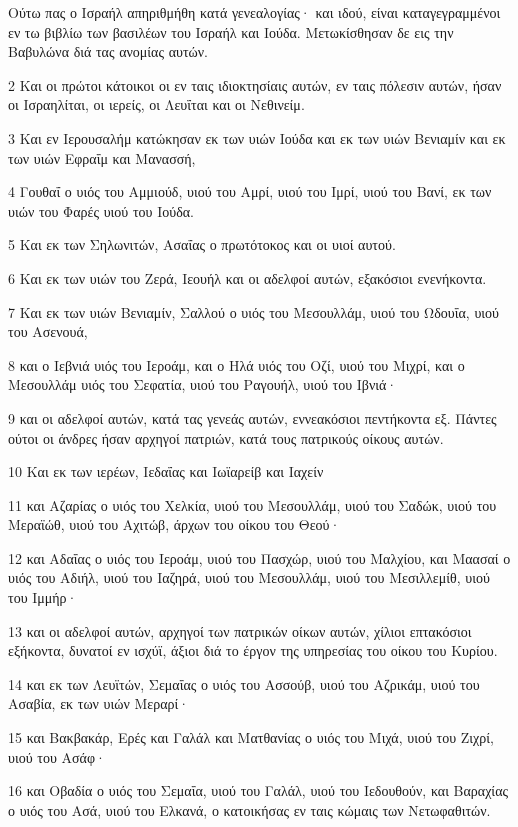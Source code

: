 \par Ούτω πας ο Ισραήλ απηριθμήθη κατά γενεαλογίας· και ιδού, είναι καταγεγραμμένοι εν τω βιβλίω των βασιλέων του Ισραήλ και Ιούδα. Μετωκίσθησαν δε εις την Βαβυλώνα διά τας ανομίας αυτών.
\par 2 Και οι πρώτοι κάτοικοι οι εν ταις ιδιοκτησίαις αυτών, εν ταις πόλεσιν αυτών, ήσαν οι Ισραηλίται, οι ιερείς, οι Λευΐται και οι Νεθινείμ.
\par 3 Και εν Ιερουσαλήμ κατώκησαν εκ των υιών Ιούδα και εκ των υιών Βενιαμίν και εκ των υιών Εφραΐμ και Μανασσή,
\par 4 Γουθαΐ ο υιός του Αμμιούδ, υιού του Αμρί, υιού του Ιμρί, υιού του Βανί, εκ των υιών του Φαρές υιού του Ιούδα.
\par 5 Και εκ των Σηλωνιτών, Ασαΐας ο πρωτότοκος και οι υιοί αυτού.
\par 6 Και εκ των υιών του Ζερά, Ιεουήλ και οι αδελφοί αυτών, εξακόσιοι ενενήκοντα.
\par 7 Και εκ των υιών Βενιαμίν, Σαλλού ο υιός του Μεσουλλάμ, υιού του Ωδουΐα, υιού του Ασενουά,
\par 8 και ο Ιεβνιά υιός του Ιεροάμ, και ο Ηλά υιός του Οζί, υιού του Μιχρί, και ο Μεσουλλάμ υιός του Σεφατία, υιού του Ραγουήλ, υιού του Ιβνιά·
\par 9 και οι αδελφοί αυτών, κατά τας γενεάς αυτών, εννεακόσιοι πεντήκοντα εξ. Πάντες ούτοι οι άνδρες ήσαν αρχηγοί πατριών, κατά τους πατρικούς οίκους αυτών.
\par 10 Και εκ των ιερέων, Ιεδαΐας και Ιωϊαρείβ και Ιαχείν
\par 11 και Αζαρίας ο υιός του Χελκία, υιού του Μεσουλλάμ, υιού του Σαδώκ, υιού του Μεραϊώθ, υιού του Αχιτώβ, άρχων του οίκου του Θεού·
\par 12 και Αδαΐας ο υιός του Ιεροάμ, υιού του Πασχώρ, υιού του Μαλχίου, και Μαασαί ο υιός του Αδιήλ, υιού του Ιαζηρά, υιού του Μεσουλλάμ, υιού του Μεσιλλεμίθ, υιού του Ιμμήρ·
\par 13 και οι αδελφοί αυτών, αρχηγοί των πατρικών οίκων αυτών, χίλιοι επτακόσιοι εξήκοντα, δυνατοί εν ισχύϊ, άξιοι διά το έργον της υπηρεσίας του οίκου του Κυρίου.
\par 14 και εκ των Λευϊτών, Σεμαΐας ο υιός του Ασσούβ, υιού του Αζρικάμ, υιού του Ασαβία, εκ των υιών Μεραρί·
\par 15 και Βακβακάρ, Ερές και Γαλάλ και Ματθανίας ο υιός του Μιχά, υιού του Ζιχρί, υιού του Ασάφ·
\par 16 και Οβαδία ο υιός του Σεμαΐα, υιού του Γαλάλ, υιού του Ιεδουθούν, και Βαραχίας ο υιός του Ασά, υιού του Ελκανά, ο κατοικήσας εν ταις κώμαις των Νετωφαθιτών.
